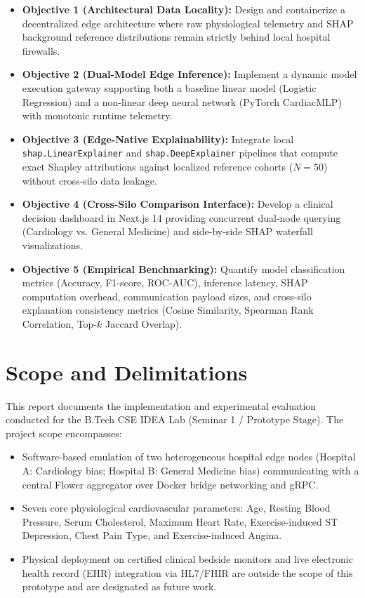 \documentclass[12pt,a4paper,oneside]{report}
\begin{document}
\begin{itemize}
    \item \textbf{Objective 1 (Architectural Data Locality):} Design and containerize a decentralized edge architecture where raw physiological telemetry and SHAP background reference distributions remain strictly behind local hospital firewalls.
    \item \textbf{Objective 2 (Dual-Model Edge Inference):} Implement a dynamic model execution gateway supporting both a baseline linear model (Logistic Regression) and a non-linear deep neural network (PyTorch CardiacMLP) with monotonic runtime telemetry.
    \item \textbf{Objective 3 (Edge-Native Explainability):} Integrate local \texttt{shap.LinearExplainer} and \texttt{shap.DeepExplainer} pipelines that compute exact Shapley attributions against localized reference cohorts ($N=50$) without cross-silo data leakage.
    \item \textbf{Objective 4 (Cross-Silo Comparison Interface):} Develop a clinical decision dashboard in Next.js 14 providing concurrent dual-node querying (Cardiology vs. General Medicine) and side-by-side SHAP waterfall visualizations.
    \item \textbf{Objective 5 (Empirical Benchmarking):} Quantify model classification metrics (Accuracy, F1-score, ROC-AUC), inference latency, SHAP computation overhead, communication payload sizes, and cross-silo explanation consistency metrics (Cosine Similarity, Spearman Rank Correlation, Top-$k$ Jaccard Overlap).
\end{itemize}

\section{Scope and Delimitations}
This report documents the implementation and experimental evaluation conducted for the B.Tech CSE IDEA Lab (Seminar 1 / Prototype Stage). The project scope encompasses:
\begin{itemize}
    \item Software-based emulation of two heterogeneous hospital edge nodes (Hospital A: Cardiology bias; Hospital B: General Medicine bias) communicating with a central Flower aggregator over Docker bridge networking and gRPC.
    \item Seven core physiological cardiovascular parameters: Age, Resting Blood Pressure, Serum Cholesterol, Maximum Heart Rate, Exercise-induced ST Depression, Chest Pain Type, and Exercise-induced Angina.
    \item Physical deployment on certified clinical bedside monitors and live electronic health record (EHR) integration via HL7/FHIR are outside the scope of this prototype and are designated as future work.
\end{itemize}
\end{document}
